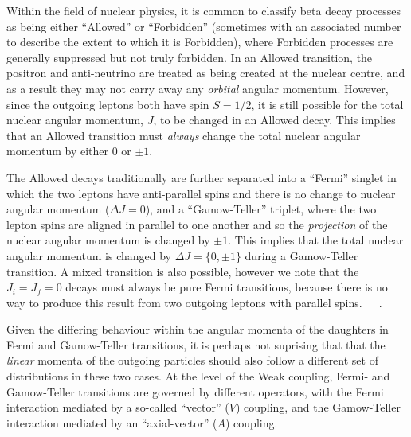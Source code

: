Within the field of nuclear physics, it is common to classify beta decay processes as being either ``Allowed'' or ``Forbidden'' (sometimes with an associated number to describe the extent to which it is Forbidden), where Forbidden processes are generally suppressed but not truly forbidden.  In an Allowed transition, the positron and anti-neutrino are treated as being created at the nuclear centre, and as a result they may not carry away any \emph{orbital} angular momentum.  However, since the outgoing leptons both have spin $S=1/2$, it is still possible for the total nuclear angular momentum, $J$, to be changed in an Allowed decay.  This implies that an Allowed transition must \emph{always} change the total nuclear angular momentum by either $0$ or $\pm1$.  

The Allowed decays traditionally are further separated into a ``Fermi'' singlet in which the two leptons have anti-parallel spins and there is no change to nuclear angular momentum ($\Delta J = 0$), and a ``Gamow-Teller'' triplet, where the two lepton spins are aligned in parallel to one another and so the \emph{projection} of the nuclear angular momentum is changed by $\pm1$.  This implies that the total nuclear angular momentum is changed by $\Delta J = \{0, \pm1\}$ during a Gamow-Teller transition.  A mixed transition is also possible, however we note that the $J_i = J_f = 0$ decays must always be pure Fermi transitions, because there is no way to produce this result from two outgoing leptons with parallel spins.~\cite{krane}~\cite{wong1990}~\cite{severijns_beck_cuncic_2006}.

Given the differing behaviour within the angular momenta of the daughters in Fermi and Gamow-Teller transitions, it is perhaps not suprising that that the \emph{linear} momenta of the outgoing particles should also follow a different set of distributions in these two cases.  At the level of the Weak coupling, Fermi- and Gamow-Teller transitions are governed by different operators, with the Fermi interaction mediated by a so-called ``vector'' ($V$) coupling, and the Gamow-Teller interaction mediated by an ``axial-vector'' ($A$) coupling.





